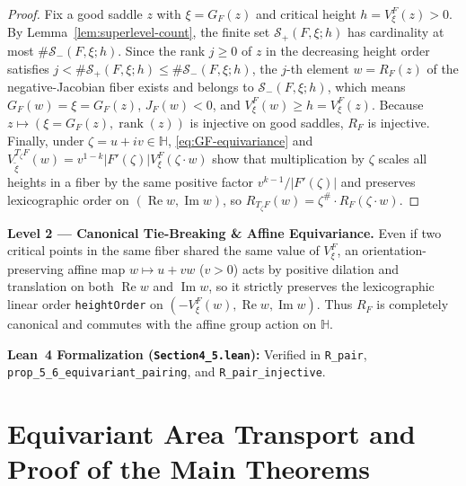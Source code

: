 \documentclass[12pt]{article}
\def\H{\mathbb{H}}
\def\S{\mathcal{S}}
\theoremstyle{definition}
\numberwithin{equation}{section}
\begin{document}
\begin{proof}
Fix a good saddle $z$ with $\xi = G_F(z)$ and critical height $h = V_\xi^F(z) > 0$. By Lemma~\ref{lem:superlevel-count}, the finite set $\S_+(F, \xi; h)$ has cardinality at most $\#\S_-(F, \xi; h)$. Since the rank $j \ge 0$ of $z$ in the decreasing height order satisfies $j < \#\S_+(F, \xi; h) \le \#\S_-(F, \xi; h)$, the $j$-th element $w = R_F(z)$ of the negative-Jacobian fiber exists and belongs to $\S_-(F, \xi; h)$, which means $G_F(w) = \xi = G_F(z)$, $J_F(w) < 0$, and $V_\xi^F(w) \ge h = V_\xi^F(z)$. Because $z \mapsto (\xi = G_F(z), \operatorname{rank}(z))$ is injective on good saddles, $R_F$ is injective. Finally, under $\zeta = u + iv \in \H$, \eqref{eq:GF-equivariance} and $V_{\tilde{\xi}}^{T_\zeta F}(w) = v^{1-k} |F'(\zeta)| V_\xi^F(\zeta \cdot w)$ show that multiplication by $\zeta$ scales all heights in a fiber by the same positive factor $v^{k-1}/|F'(\zeta)|$ and preserves lexicographic order on $(\operatorname{Re} w, \operatorname{Im} w)$, so $R_{T_\zeta F}(w) = \zeta^\# \cdot R_F(\zeta \cdot w)$.
\end{proof}

\begin{leveltwo}
\noindent\textbf{\textcolor{l2border}{Level 2 --- Canonical Tie-Breaking \& Affine Equivariance.}}
Even if two critical points in the same fiber shared the same value of $V_\xi^F$, an orientation-preserving affine map $w \mapsto u + vw$ ($v > 0$) acts by positive dilation and translation on both $\operatorname{Re} w$ and $\operatorname{Im} w$, so it strictly preserves the lexicographic linear order \texttt{heightOrder} on $(-V_\xi^F(w), \operatorname{Re} w, \operatorname{Im} w)$. Thus $R_F$ is completely canonical and commutes with the affine group action on $\H$.

\smallskip
\noindent\textbf{\textcolor{leannote}{Lean~4 Formalization (\texttt{Section4\_5.lean}):}} Verified in \texttt{R\_pair}, \texttt{prop\_5\_6\_equivariant\_pairing}, and \texttt{R\_pair\_injective}.
\end{leveltwo}

\section{Equivariant Area Transport and Proof of the Main Theorems}
\end{document}
